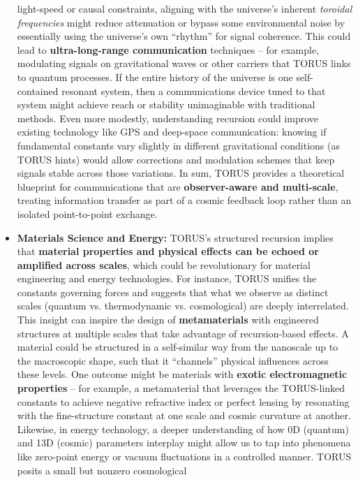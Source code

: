 \begin{itemize}
  light-speed or causal constraints, aligning with the universe's
  inherent \emph{toroidal frequencies} might reduce attenuation or
  bypass some environmental noise by essentially using the universe's
  own ``rhythm'' for signal coherence. This could lead to
  \textbf{ultra-long-range communication} techniques -- for example,
  modulating signals on gravitational waves or other carriers that TORUS
  links to quantum processes. If the entire history of the universe is
  one self-contained resonant system, then a communications device tuned
  to that system might achieve reach or stability unimaginable with
  traditional methods. Even more modestly, understanding recursion could
  improve existing technology like GPS and deep-space communication:
  knowing if fundamental constants vary slightly in different
  gravitational conditions (as TORUS hints​) would allow corrections and
  modulation schemes that keep signals stable across those variations.
  In sum, TORUS provides a theoretical blueprint for communications that
  are \textbf{observer-aware and multi-scale}, treating information
  transfer as part of a cosmic feedback loop rather than an isolated
  point-to-point exchange.
\item
  \textbf{Materials Science and Energy:} TORUS's structured recursion
  implies that \textbf{material properties and physical effects can be
  echoed or amplified across scales}, which could be revolutionary for
  material engineering and energy technologies. For instance, TORUS
  unifies the constants governing forces and suggests that what we
  observe as distinct scales (quantum vs. thermodynamic vs.
  cosmological) are deeply interrelated​. This insight can inspire the
  design of \textbf{metamaterials} with engineered structures at
  multiple scales that take advantage of recursion-based effects. A
  material could be structured in a self-similar way from the nanoscale
  up to the macroscopic shape, such that it ``channels'' physical
  influences across these levels. One outcome might be materials with
  \textbf{exotic electromagnetic properties} -- for example, a
  metamaterial that leverages the TORUS-linked constants to achieve
  negative refractive index or perfect lensing by resonating with the
  fine-structure constant at one scale and cosmic curvature at another.
  Likewise, in energy technology, a deeper understanding of how 0D
  (quantum) and 13D (cosmic) parameters interplay might allow us to tap
  into phenomena like zero-point energy or vacuum fluctuations in a
  controlled manner. TORUS posits a small but nonzero cosmological

\end{itemize}
